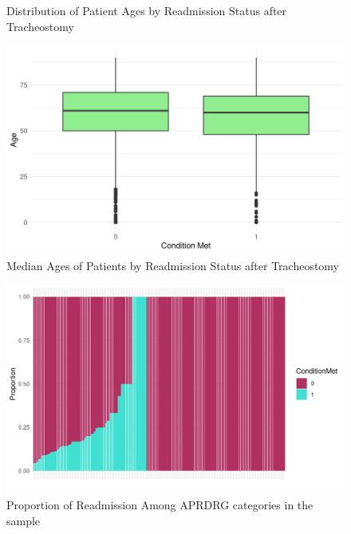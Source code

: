 \documentclass[sn-basic,pdflatex]{sn-jnl}
\theoremstyle{remark}
\theoremstyle{definition}
\begin{document}
\begin{appendices}
\begin{figure}[H]
{}

\caption{ Distribution of Patient Ages by Readmission Status after Tracheostomy}\label{fig:AGE}
\end{figure}
\begin{figure}[H]

{\centering \includegraphics[width=1\linewidth]{figures/AGE2} 

}

\caption{ Median Ages of Patients by Readmission Status after Tracheostomy }\label{fig:AGE2}
\end{figure}
\begin{figure}[H]

{\centering \includegraphics[width=1\linewidth]{figures/APRDRG} 

}

\caption{Proportion of Readmission Among APRDRG categories in the sample}\label{fig:APRDRG}
\end{figure}
\begin{figure}[H]


\end{figure}
\end{appendices}
\end{document}
